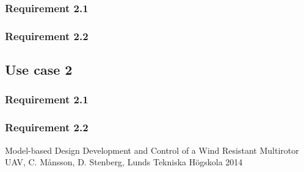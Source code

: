 \documentclass[a4paper]{article}
\begin{document}
\subsubsection{Requirement 2.1}
\subsubsection{Requirement 2.2}


\subsection{Use case 2}
\subsubsection{Requirement 2.1}
\subsubsection{Requirement 2.2}



\begin{thebibliography}{99}
 Model-based Design Development and Control of a Wind Resistant Multirotor UAV, C. Månsson, D. Stenberg, Lunds Tekniska Högskola 2014
\end{thebibliography}
\end{document}
